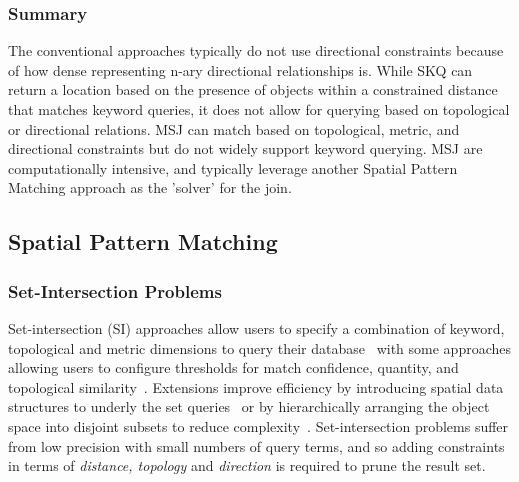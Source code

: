 \subsubsection{Summary}

\par{
    The conventional approaches typically do not use directional constraints because of how dense representing n-ary directional relationships is.
    While SKQ can return a location based on the presence of objects within a constrained distance that matches keyword queries, it does not allow for querying based on topological or directional relations.
    MSJ can match based on topological, metric, and directional constraints but do not widely support keyword querying. 
    MSJ are computationally intensive, and typically leverage another Spatial Pattern Matching approach as the 'solver' for the join. 
}

\subsection{Spatial Pattern Matching}


\subsubsection{Set-Intersection Problems}
\par{  
    Set-intersection (SI) approaches allow users to specify a combination of keyword, topological and metric dimensions to query their database~\cite{DiLoreto1996} with some approaches allowing users to configure thresholds for match confidence, quantity, and topological similarity~\cite{Soffer1996, Soffer1997, Soffer1998a}. 
    Extensions improve efficiency by introducing spatial data structures to underly the set queries~\cite{Soffer1999} or by hierarchically arranging the object space into disjoint subsets to reduce complexity~\cite{Osul2023}.
    Set-intersection problems suffer from low precision with small numbers of query terms, and so adding constraints in terms of \textit{distance, topology} and \textit{direction} is required to prune the result set.
    
}
